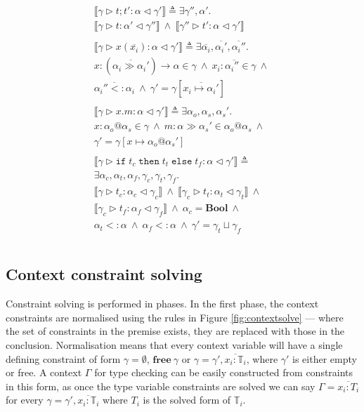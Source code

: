 \documentclass{article}
\newcommand{\figref}[1]{Figure \ref{#1}}
\newcommand{\inferrule}[4]{\llbracket #1 \triangleright #2 : #3 \triangleleft #4 \rrbracket}
\newcommand{\inferlhs}[1]{\llbracket \gamma \triangleright #1 : \alpha \triangleleft \gamma' \rrbracket}
\newcommand{\boolt}{\mathbf{Bool}}
\newcommand{\ift}[3]{\mathtt{if} \; #1 \; \mathtt{then} \; #2 \; \mathtt{else} \; #3}
\newcommand{\cand}{\:\wedge\:}
\newcommand{\free}[1]{\mathbf{free}\:#1}
\begin{document}
\[\begin{array}{l}
\inferlhs{t ; t'} \triangleq
\exists \gamma'', \alpha' . \\
\inferrule{\gamma}{t}{\alpha'}{\gamma''}
\cand
\inferrule{\gamma''}{t'}{\alpha}{\gamma'}
\\\\

\inferlhs{x ( \overline{x_i} )} \triangleq
\exists \overline{\alpha_i}, \overline{\alpha_i'},\overline{\alpha_i''} . \\
x : ( \overline{\alpha_i \gg \alpha_i'} ) \rightarrow \alpha \in \gamma
\cand 
\overline{x_i : \alpha_i'' \in \gamma}
\cand
\\ 
\overline{\alpha_i'' <: \alpha_i}
\cand
\gamma' = \gamma [ \overline{x_i \mapsto \alpha_i'} ]
\\\\

\inferlhs{x.m} \triangleq
\exists \alpha_o, \alpha_s, \alpha_s' . \\
x : \alpha_o @ \alpha_s \in \gamma
\cand 
m : \alpha \gg \alpha_s' \in \alpha_o @ \alpha_s
\cand  \\
\gamma' = \gamma[ x \mapsto \alpha_o @ \alpha_s' ]
\\\\

\inferlhs{\ift{t_c}{t_t}{t_f}} \triangleq
\\
\exists \alpha_c, \alpha_t, \alpha_f, \gamma_c, \gamma_t, \gamma_f . \\
\inferrule{\gamma}{t_c}{\alpha_c}{\gamma_c}
\cand
\inferrule{\gamma_c}{t_t}{\alpha_t}{\gamma_t}
\cand 
\\
\inferrule{\gamma_c}{t_f}{\alpha_f}{\gamma_f}
\cand
\alpha_c = \boolt
\cand
\\
\alpha_t <: \alpha
\cand
\alpha_f <: \alpha
\cand
\gamma' = \gamma_t \sqcup \gamma_f
\\\\

\end{array}
\]

\subsection{Context constraint solving}

Constraint solving is performed in phases. In the first phase, the context 
constraints
are normalised using the rules in \figref{fig:contextsolve} --- where the set of 
constraints in the premise exists, they are replaced with those in the 
conclusion. Normalisation means that every context variable will have a single 
defining constraint of form $\gamma = \emptyset$, $\free{\gamma}$ or
$\gamma = \gamma', \overline{x_i : \mathbb{T}_i}$, where $\gamma'$ is
either empty or free. A context $\Gamma$ for type checking can be easily
constructed from constraints in this form, as once the type variable
constraints are solved we can say $\Gamma = \overline{x_i : T_i}$ for
every $\gamma = \gamma', \overline{x_i : \mathbb{T}_i}$ where $T_i$ is the
solved form of $\mathbb{T}_i$.
\end{document}
